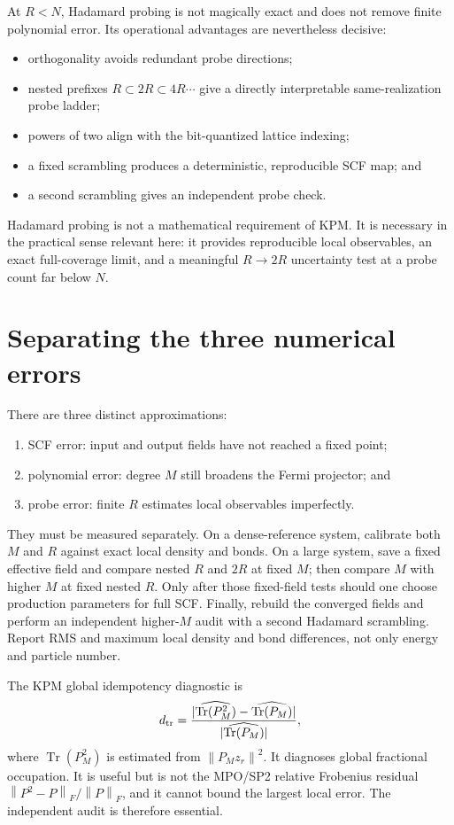 \documentclass[11pt,a4paper]{article}
\newcommand{\Tr}{\operatorname{Tr}}
\newcommand{\norm}[1]{\left\lVert #1\right\rVert}
\begin{document}
At $R<N$, Hadamard probing is not magically exact and does not remove finite
polynomial error. Its operational advantages are nevertheless decisive:
\begin{itemize}[leftmargin=1.7em]
\item orthogonality avoids redundant probe directions;
\item nested prefixes $R\subset2R\subset4R\cdots$ give a directly interpretable
same-realization probe ladder;
\item powers of two align with the bit-quantized lattice indexing;
\item a fixed scrambling produces a deterministic, reproducible SCF map; and
\item a second scrambling gives an independent probe check.
\end{itemize}
Hadamard probing is not a mathematical requirement of KPM. It is necessary in
the practical sense relevant here: it provides reproducible local observables,
an exact full-coverage limit, and a meaningful $R\to2R$ uncertainty test at a
probe count far below $N$.

\section{\hspace{0.5em}Separating the three numerical errors}
There are three distinct approximations:
\begin{enumerate}[leftmargin=1.7em]
\item SCF error: input and output fields have not reached a fixed point;
\item polynomial error: degree $M$ still broadens the Fermi projector; and
\item probe error: finite $R$ estimates local observables imperfectly.
\end{enumerate}
They must be measured separately. On a dense-reference system, calibrate both
$M$ and $R$ against exact local density and bonds. On a large system, save a
fixed effective field and compare nested $R$ and $2R$ at fixed $M$; then
compare $M$ with higher $M$ at fixed nested $R$. Only after those fixed-field
tests should one choose production parameters for full SCF. Finally, rebuild
the converged fields and perform an independent higher-$M$ audit with a second
Hadamard scrambling. Report RMS and maximum local density and bond differences,
not only energy and particle number.

The KPM global idempotency diagnostic is
\begin{equation}
 d_{\rm tr}=\frac{|\widehat{\Tr(P_M^2)}-\widehat{\Tr(P_M)}|}
 {|\widehat{\Tr(P_M)}|},
\end{equation}
where $\Tr(P_M^2)$ is estimated from $\norm{P_Mz_r}^2$. It diagnoses global
fractional occupation. It is useful but is not the MPO/SP2 relative Frobenius
residual $\norm{P^2-P}_F/\norm P_F$, and it cannot bound the largest local
error. The independent audit is therefore essential.
\end{document}
